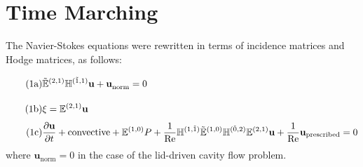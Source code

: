 \section{Time Marching}

The Navier-Stokes equations were rewritten in terms of incidence matrices and Hodge matrices, as follows:
\begin{align}
    \stepcounter{equation}
    \tag{{\theequation}a}
    \label{eq:timeContinuity}
    &\tilde{\mathbb{E}}^{(2,1)} \mathbb{H}^{(\tilde{1},1)} \mathbf{u} + \mathbf{u}^{}_{\text{norm}} = 0 \vphantom{\frac{\partial^{(1)}}{\partial}} \\
    \tag{{\theequation}b}
    \label{eq:timeVorticity}
    &\xi = \mathbb{E}^{(2,1)} \mathbf{u} \vphantom{\frac{\partial^{(1)}}{\partial}} \\
    \tag{{\theequation}c}
    \label{eq:timeMomentum}
    &\frac{\partial \mathbf{u}}{\partial t} + \text{convective} + \mathbb{E}^{(1,0)} P + \frac{1}{\text{Re}} \mathbb{H}^{(1,\tilde{1})} \tilde{\mathbb{E}}^{(1,0)} \mathbb{H}^{(\tilde{0},2)} \mathbb{E}^{(2,1)} \mathbf{u} + \frac{1}{\text{Re}} \mathbf{u}_{\text{prescribed}} = 0
\end{align}
where $\mathbf{u}^{}_{\text{norm}} = 0$ in the case of the lid-driven cavity flow problem.

